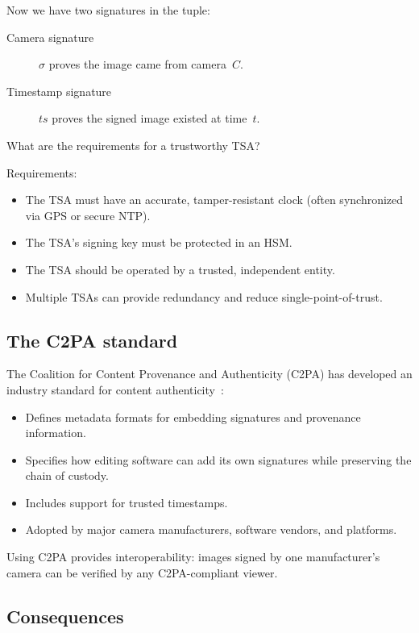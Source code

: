 Now we have two signatures in the tuple:
\begin{description}
  \item[Camera signature] \(\sigma\) proves the image came from
    camera~\(C\).
  \item[Timestamp signature] \(\mathit{ts}\) proves the signed image
    existed at time~\(t\).
\end{description}

\begin{exercise}
  What are the requirements for a trustworthy TSA?
\end{exercise}

Requirements:
\begin{itemize}
  \item The TSA must have an accurate, tamper-resistant clock (often 
    synchronized via GPS or secure NTP).
  \item The TSA's signing key must be protected in an HSM.
  \item The TSA should be operated by a trusted, independent entity.
  \item Multiple TSAs can provide redundancy and reduce single-point-of-trust.
\end{itemize}

\subsection{The C2PA standard}

The Coalition for Content Provenance and Authenticity (C2PA) has developed
an industry standard for content authenticity~\autocite{C2PAspec}:
\begin{itemize}
  \item Defines metadata formats for embedding signatures and provenance 
    information.
  \item Specifies how editing software can add its own signatures while 
    preserving the chain of custody.
  \item Includes support for trusted timestamps.
  \item Adopted by major camera manufacturers, software vendors, and platforms.
\end{itemize}

Using C2PA provides interoperability: images signed by one manufacturer's 
camera can be verified by any C2PA-compliant viewer.

\subsection{Consequences}

